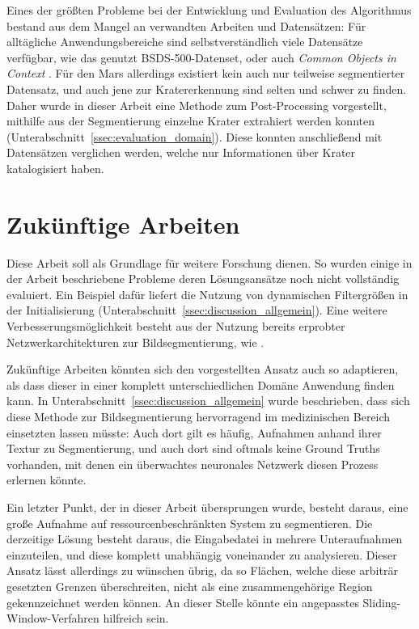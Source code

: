Eines der größten Probleme bei der Entwicklung und Evaluation des Algorithmus bestand aus dem Mangel an verwandten Arbeiten und Datensätzen: Für alltägliche Anwendungsbereiche sind selbstverständlich viele Datensätze verfügbar, wie das genutzt BSDS-500-Datenset, oder auch \textit{Common Objects in Context} \cite{lin_14}. Für den Mars allerdings existiert kein auch nur teilweise segmentierter Datensatz, und auch jene zur Kratererkennung sind selten und schwer zu finden. Daher wurde in dieser Arbeit eine Methode zum Post-Processing vorgestellt, mithilfe aus der Segmentierung einzelne Krater extrahiert werden konnten (\vgl Unterabschnitt~\ref{ssec:evaluation_domain}). Diese konnten anschließend mit Datensätzen verglichen werden, welche nur Informationen über Krater katalogisiert haben.

\section{Zukünftige Arbeiten}

Diese Arbeit soll als Grundlage für weitere Forschung dienen. So wurden einige in der Arbeit beschriebene Probleme \bzw deren Lösungsansätze noch nicht vollständig evaluiert. Ein Beispiel dafür liefert die Nutzung von dynamischen Filtergrößen in der Initialisierung (\vgl Unterabschnitt~\ref{ssec:discussion_allgemein}). Eine weitere Verbesserungsmöglichkeit besteht aus der Nutzung bereits erprobter Netzwerkarchitekturen zur Bildsegmentierung, wie \bspw \cite{ronneberger_15}.

Zukünftige Arbeiten könnten sich den vorgestellten Ansatz auch so adaptieren, als dass dieser in einer komplett unterschiedlichen Domäne Anwendung finden kann. In Unterabschnitt~\ref{ssec:discussion_allgemein} wurde beschrieben, dass sich diese Methode zur Bildsegmentierung hervorragend im medizinischen Bereich einsetzten lassen müsste: Auch dort gilt es häufig, Aufnahmen anhand ihrer Textur zu Segmentierung, und auch dort sind oftmals keine Ground Truths vorhanden, mit denen ein überwachtes neuronales Netzwerk diesen Prozess erlernen könnte.

Ein letzter Punkt, der in dieser Arbeit übersprungen wurde, besteht daraus, eine große Aufnahme auf ressourcenbeschränkten System zu segmentieren. Die derzeitige Lösung besteht daraus, die Eingabedatei in mehrere Unteraufnahmen einzuteilen, und diese komplett unabhängig voneinander zu analysieren. Dieser Ansatz lässt allerdings zu wünschen übrig, da so Flächen, welche diese arbiträr gesetzten Grenzen überschreiten, nicht als eine zusammengehörige Region gekennzeichnet werden können. An dieser Stelle könnte ein angepasstes Sliding-Window-Verfahren hilfreich sein.